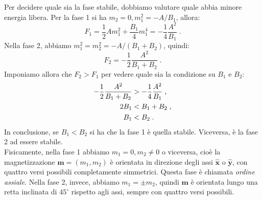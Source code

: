 \documentclass[10pt,a4paper]{report}
\theoremstyle{definition}
\numberwithin{equation}{section}
\begin{document}
Per decidere quale sia la fase stabile, dobbiamo valutare quale abbia minore energia libera. Per la fase 1 si ha $m_2=0,m_1^2=-A/B_1$, allora:
\begin{equation}
F_1=\frac{1}{2}Am_1^2+\frac{B_1}{4}m_1^4=-\frac{1}{4}\frac{A^2}{B_1}\;.
\end{equation}
Nella fase 2, abbiamo $m_1^2=m_2^2=-A/(B_1+B_2)$, quindi:
\begin{equation}
F_2=-\frac{1}{2}\frac{A^2}{B_1+B_2}\;.
\end{equation}
Imponiamo allora che $F_2>F_1$ per vedere quale sia la condizione su $B_1$ e $B_2$:
\begin{align}
-\frac{1}{2}\frac{A^2}{B_1+B_2}&>-\frac{1}{4}\frac{A^2}{B_1} \notag\;, \\
2B_1 &<B_1+B_2 \notag\;, \\
B_1&< B_2\;.
\end{align}
In conclusione, se $B_1<B_2$ si ha che la fase 1 è quella stabile. Viceversa, è la fase 2 ad essere stabile. \\
Fisicamente, nella fase 1 abbiamo $m_1=0,m_2\ne 0$ o viceversa, cioè la magnetizzazione $\mathbf{m}=(m_1,m_2)$ è orientata in direzione degli assi $\mathbf{\hat{x}}$ o $\mathbf{\hat{y}}$, con quattro versi possibili completamente simmetrici. Questa fase è chiamata \emph{ordine assiale}. Nella fase 2, invece, abbiamo $m_1=\pm m_2$, quindi $\mathbf{m}$ è orientata lungo una retta inclinata di $45^{\circ}$ rispetto agli assi, sempre con quattro versi possibili.
\end{document}
